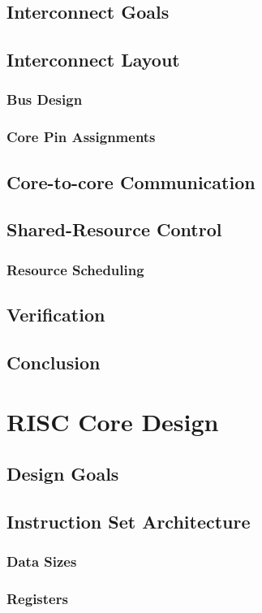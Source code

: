 \documentclass[11pt,a4paper,twoside]{report}
\begin{document}
    \section{Interconnect Goals}
    \section{Interconnect Layout}
        \subsection{Bus Design}
        \subsection{Core Pin Assignments}
    \section{Core-to-core Communication}
    \section{Shared-Resource Control}
        \subsection{Resource Scheduling}
    \section{Verification}
    \section{Conclusion}

\chapter{RISC Core Design}
    \section{Design Goals}
    \section{Instruction Set Architecture}
        \subsection{Data Sizes}
        \subsection{Registers}
\end{document}
